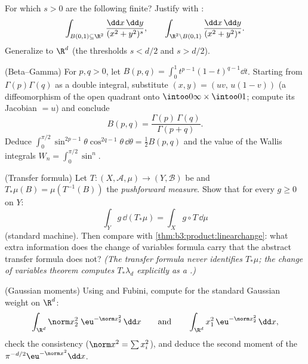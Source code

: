 \begin{exercise}[$\star\star$]\label{exo:b3:product:7}
For which $s > 0$ are the following finite? Justify with :
\[
\int_{B(0,1)\subseteq\R^2}\frac{\dd x\,\dd y}{(x^2 +
y^2)^{s}},
\qquad
\int_{\R^2\setminus B(0,1)}\frac{\dd x\,\dd y}{(x^2 +
y^2)^{s}} .
\]
Generalize to $\R^d$ (the thresholds $s < d/2$ and $s > d/2$).
\end{exercise}

\begin{exercise}[$\star\star\star$]\label{exo:b3:product:8}
(Beta--Gamma) For $p, q > 0$, let $B(p, q) = \int_0^1t^{p-1}(1
- t)^{q-1}\dd t$. Starting from $\Gamma(p)\Gamma(q)$ as a
double integral, substitute $(x, y) = (uv,\, u(1 - v))$ (a
diffeomorphism of the open quadrant onto
$\intoo0\infty\times\intoo01$; compute its Jacobian $= u$) and
conclude
\[
B(p, q) = \frac{\Gamma(p)\,\Gamma(q)}{\Gamma(p + q)} .
\]
Deduce $\int_0^{\pi/2}\sin^{2p-1}\theta\cos^{2q-1}\theta\,
\dd\theta = \frac12B(p,q)$ and the value of the Wallis
integrals $W_n = \int_0^{\pi/2}\sin^n$.
\end{exercise}

\begin{exercise}[$\star\star$]\label{exo:b3:product:9}
(Transfer formula) Let $T \colon (X, \mathcal A, \mu) \to (Y,
\mathcal B)$ be  and $T_*\mu(B) = \mu(T^{-1}(B))$
the \emph{pushforward measure}.
Show that for every  $g \geq 0$ on $Y$:
\[
\int_Y g\,\dd(T_*\mu) = \int_X g\circ T\,\dd\mu
\]
(standard machine). Then compare with
\cref{thm:b3:product:linearchange}: what extra information does
the change of variables formula carry that the abstract
transfer formula does not? \emph{(The transfer formula never
identifies $T_*\mu$; the change of variables theorem computes
$T_*\lambda_d$ explicitly as a  .)}
\end{exercise}

\begin{exercise}[$\star\star\star$]\label{exo:b3:product:10}
(Gaussian moments) Using  and Fubini, compute
for the standard Gaussian weight on $\R^d$:
\[
\int_{\R^d}\norm x_2^2\;\eu^{-\norm x_2^2}\,\dd x
\qquad\text{and}\qquad
\int_{\R^d}x_1^2\,\eu^{-\norm x^2_2}\,\dd x,
\]
check the consistency ($\norm x^2 = \sum x_i^2$), and deduce
the second moment of the 
$\pi^{-d/2}\eu^{-\norm x^2}\dd x$.
\end{exercise}


